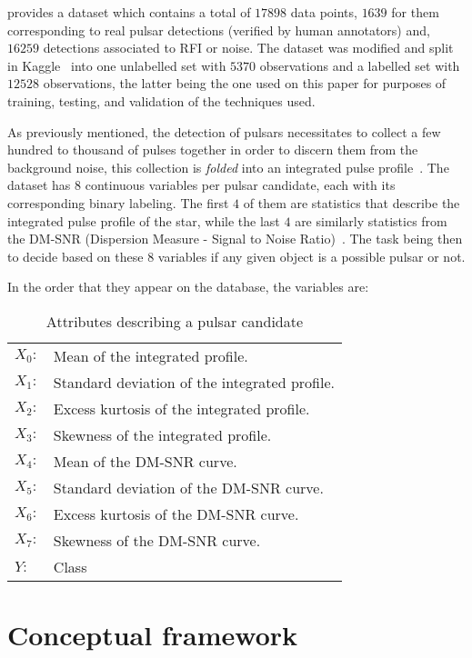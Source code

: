\documentclass[journal]{IEEEtran}
\begin{document}
\citet{pulsar:dataset:lyon} provides a dataset which contains a total of $17898$
data points, $1639$ for them corresponding to real pulsar detections (verified
by human annotators) and, $16259$ detections associated to RFI or noise. The
dataset was modified and split in Kaggle~\cite{pulsar:dataset:kaggle} into one
unlabelled set with $5370$ observations and a labelled set with $12528$
observations, the latter being the one used on this paper for purposes of
training, testing, and validation of the techniques used.

As previously mentioned, the detection of pulsars necessitates to collect a few
hundred to thousand of pulses together in order to discern them from the
background noise, this collection is \textit{folded} into an integrated pulse
profile~\cite{pulsar:importance:kramer}. The dataset has 8 continuous variables per
pulsar candidate, each with its corresponding binary labeling. The first $4$ of
them are statistics that describe the integrated pulse profile of the star,
while the last $4$ are similarly statistics from the DM-SNR (Dispersion Measure
- Signal to Noise Ratio)~\cite{pulsar:dataset:explanation:lyon}. The task being
then to decide based on these 8 variables if any given object is a possible
pulsar or not.

In the order that they appear on the database, the variables are:

\begin{table}[ht]
    \begin{tabular}{l|l}
        $X_0:$ & Mean of the integrated profile.\\
        $X_1:$ & Standard deviation of the integrated profile.\\
        $X_2:$ & Excess kurtosis of the integrated profile.\\
        $X_3:$ & Skewness of the integrated profile.\\
        $X_4:$ & Mean of the DM-SNR curve.\\
        $X_5:$ & Standard deviation of the DM-SNR curve.\\
        $X_6:$ & Excess kurtosis of the DM-SNR curve.\\
        $X_7:$ & Skewness of the DM-SNR curve.\\
        $Y:$   & Class 
    \end{tabular}
    \caption{Attributes describing a pulsar candidate\label{tab:variables}}
\end{table}

\section{Conceptual framework}
\end{document}
